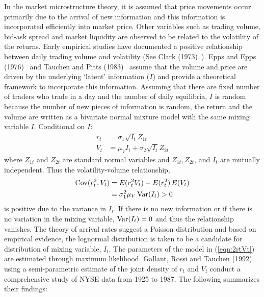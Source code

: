 In the market microstructure theory, it is assumed that price movements occur primarily due to the arrival of new information and this information is incorporated efficiently into market price. Other variables such as trading volume, bid-ask spread and market liquidity are observed to be related to the volatility of the returns. Early empirical studies have documented a positive relationship between daily trading volume and volatility (See Clark (1973)~\cite{clark}). Epps and Epps (1976)~\cite{epps} and Tauchen and Pitts (1983)~\cite{tauchenpitts} assume that the volume and price are driven by the underlying `latent' information ($I$) and provide a theoretical framework to incorporate this information. Assuming that there are fixed number of traders who trade in a day and the number of daily equilibria, $I$ is random because the number of new pieces of information is random, the return and the volume are written as a bivariate normal mixture model with the same mixing variable $I$. Conditional on $I$:
	\begin{equation}\label{eqn:2rtVt}
	\begin{split}
	 r_t&= \sigma_1\sqrt{I_t}Z_{1t} \\
	 V_t&= \mu_VI_t + \sigma_2\sqrt{I_t}Z_{2t}
	 \end{split}
	 \end{equation}
where $Z_{1t}$ and $Z_{2t}$ are standard normal variables and $Z_{1t}, Z_{2t}$, and $I_t$ are mutually independent. Thus the volatility-volume relationship,
	\begin{equation}\label{eqn:2covVt}
	\begin{split}
	\Cov(r_t^2,V_t)& = E(r_{t}^2V_t) - E(r_t^2) \,E(V_t) \\ 
	&= \sigma_1^2\mu_V \Var(I_t) > 0
	\end{split}
	\end{equation}
is positive due to the variance in $I_t$. If there is no new information or if there is no variation in the mixing variable, $\operatorname{Var}(I_t)= 0$ and thus the relationship vanishes. The theory of arrival rates suggest a
Poisson distribution and based on empirical evidence, the lognormal distribution is taken to be a candidate for distribution of mixing variable, $I_t$. The parameters of the model in (\ref{eqn:2rtVt}) are estimated through maximum likelihood. Gallant, Rossi and Tauchen (1992)~\cite{grt} using a semi-parametric estimate of the joint density of $r_t$ and $V_t$ conduct a comprehensive study of NYSE data from 1925 to 1987. The following summarizes their findings: \\


